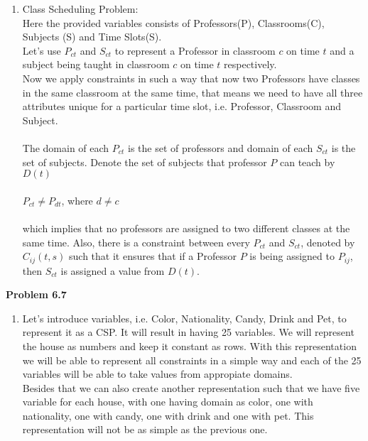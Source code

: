 \documentclass[11pt]{article}
\newcommand\tab[1][1cm]{\hspace*{#1}}
\begin{document}
\begin{enumerate}[label=(\alph*)]
  \item Class Scheduling Problem:\\
  Here the provided variables consists of Professors(P), Classrooms(C), Subjects (S) and Time Slots(S).\\
  Let's use $P_{ct}$ and $S_{ct}$ to represent a Professor in classroom $c$ on time $t$ and a subject
  being taught in classroom $c$ on time $t$ respectively.\\
  Now we apply constraints in such a way that now two Professors have classes in the same classroom at the same time,
  that means we need to have all three attributes unique for a particular time slot, i.e. Professor, Classroom and Subject.\\ \\
  The domain of each $P_{ct}$ is the set of professors and domain of each $S_{ct}$ is the set of subjects. Denote
  the set of subjects that professor $P$ can teach by $D(t)$\\ \\
  \tab \tab \tab \tab $P_{ct} \neq P_{dt}$, \tab where $d \neq c$\\ \\
  which implies that no professors are assigned to two different classes at the same time. Also, there is a constraint
  between every $P_{ct}$ and $S_{ct}$, denoted by $C_{ij}(t,s)$ such that it ensures that if a Professor $P$ is being assigned
  to $P_{ij}$, then $S_{ct}$ is assigned a value from $D(t)$.\\
\end{enumerate}
\textbf{Problem 6.7}
\begin{enumerate}[label=(\alph*)]
    \item Let's introduce variables, i.e. Color, Nationality, Candy, Drink and Pet, to represent
    it as a CSP. It will result in having 25 variables. We will represent the house as numbers and keep it constant
    as rows. With this representation we will be able to represent all constraints in a simple way and each
    of the 25 variables will be able to take values from appropiate domains.\\
    Besides that we can also create another representation such that we have five variable for each house, with
    one having domain as color, one with nationality, one with candy, one with drink and one with pet. This representation
    will not be as simple as the previous one.
\end{enumerate}
\end{document}
